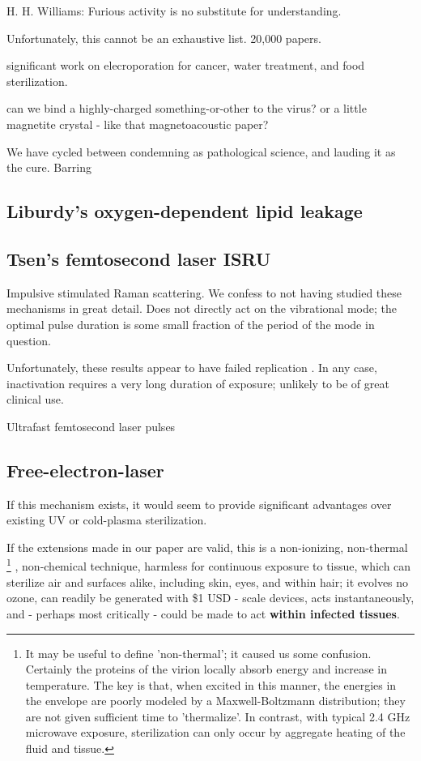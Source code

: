\documentclass[paper.tex]{subfiles}
\begin{document}
H. H. Williams: Furious activity is no substitute for understanding.

Unfortunately, this cannot be an exhaustive list. 20,000 papers.

significant work on elecroporation for cancer, water treatment, and food sterilization.


can we bind a highly-charged something-or-other to the virus?
or a little magnetite crystal - like that magnetoacoustic paper?


We have cycled between condemning as pathological science, and lauding it as the cure. Barring 


\subsection{Liburdy's oxygen-dependent lipid leakage}



\subsection{Tsen's femtosecond laser ISRU}

Impulsive stimulated Raman scattering. We confess to not having studied these mechanisms in great detail. Does not directly act on 
the vibrational mode; the optimal pulse duration is some small fraction of the period of the mode in question.

Unfortunately, these results appear to have failed replication \cite{No2011}. In any case, inactivation requires a very long duration of exposure; unlikely to be of great clinical use.

Ultrafast femtosecond laser pulses 

\subsection{Free-electron-laser }


If this mechanism exists, it would seem to provide significant advantages over existing UV or cold-plasma sterilization. 

If the extensions made in our paper are valid, this is a non-ionizing, non-thermal
%
\footnote{It may be useful to define 'non-thermal'; it caused us some confusion. Certainly the proteins of the virion locally absorb energy and increase in temperature. The key is that, when excited in this manner, the energies in the envelope are poorly modeled by a Maxwell-Boltzmann distribution; they are not given sufficient time to 'thermalize'. In contrast, with typical 2.4 GHz microwave exposure, sterilization can only occur by aggregate heating of the fluid and tissue.} 
%
, non-chemical technique, harmless for continuous exposure to tissue, which can sterilize air and surfaces alike, including skin, eyes, and within hair; it evolves no ozone, can readily be generated with \$1 USD - scale devices, acts instantaneously, and - perhaps most critically - could be made to act {\bf within infected tissues}.
\end{document}
